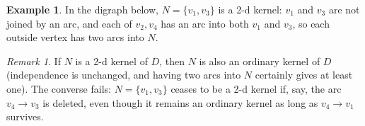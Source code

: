 \documentclass[11pt]{article}
\theoremstyle{plain}
\theoremstyle{definition}
\newtheorem{example}[theorem]{Example}
\theoremstyle{remark}
\newtheorem{remark}[theorem]{Remark}
\begin{document}
\begin{example}
  In the digraph below, $N=\{v_1,v_3\}$ is a 2-d kernel: $v_1$ and $v_3$ are not joined by an arc, and each of $v_2,v_4$ has an arc into both $v_1$ and $v_3$, so each outside vertex has two arcs into $N$.

  \begin{center}
  \end{center}
\end{example}

\begin{remark}
  If $N$ is a 2-d kernel of $D$, then $N$ is also an ordinary kernel of $D$ (independence is unchanged, and having two arcs into $N$ certainly gives at least one). The converse fails: $N=\{v_1,v_3\}$ ceases to be a 2-d kernel if, say, the arc $v_4\to v_3$ is deleted, even though it remains an ordinary kernel as long as $v_4\to v_1$ survives.
\end{remark}
\end{document}
